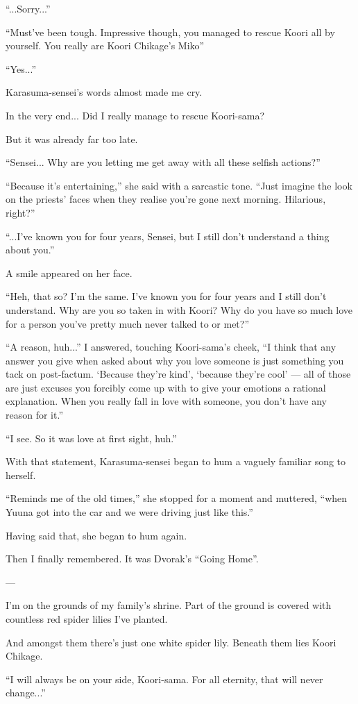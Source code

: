 ``...Sorry...''

``Must've been tough. Impressive though, you managed to rescue Koori all by yourself. You really are Koori Chikage's Miko''

``Yes...''

Karasuma-sensei's words almost made me cry.

In the very end... Did I really manage to rescue Koori-sama?

But it was already far too late.

``Sensei... Why are you letting me get away with all these selfish actions?''

``Because it's entertaining,'' she said with a sarcastic tone. ``Just imagine the look on the priests' faces when they realise you're gone next morning. Hilarious, right?''

``...I've known you for four years, Sensei, but I still don't understand a thing about you.''

A smile appeared on her face.

``Heh, that so? I'm the same. I've known you for four years and I still don't understand. Why are you so taken in with Koori? Why do you have so much love for a person you've pretty much never talked to or met?''

``A reason, huh...'' I answered, touching Koori-sama's cheek, ``I think that any answer you give when asked about why you love someone is just something you tack on post-factum. `Because they're kind', `because they're cool' --- all of those are just excuses you forcibly come up with to give your emotions a rational explanation. When you really fall in love with someone, you don't have any reason for it.''

``I see. So it was love at first sight, huh.''

With that statement, Karasuma-sensei began to hum a vaguely familiar song to herself.

``Reminds me of the old times,'' she stopped for a moment and muttered, ``when Yuuna got into the car and we were driving just like this.''

Having said that, she began to hum again.

Then I finally remembered. It was Dvorak's ``Going Home''.

---

I'm on the grounds of my family's shrine. Part of the ground is covered with countless red spider lilies I've planted.

And amongst them there's just one white spider lily. Beneath them lies Koori Chikage.

``I will always be on your side, Koori-sama. For all eternity, that will never change...''
